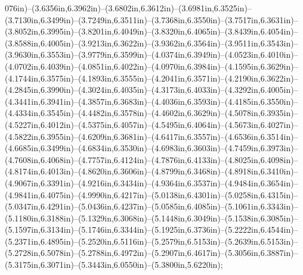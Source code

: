 076in)--(3.6356in,6.3962in)--(3.6802in,6.3612in)--(3.6981in,6.3525in)--(3.7130in,6.3499in)--(3.7249in,6.3511in)--(3.7368in,6.3550in)--(3.7517in,6.3631in)--(3.8052in,6.3995in)--(3.8201in,6.4049in)--(3.8320in,6.4065in)--(3.8439in,6.4054in)--(3.8588in,6.4005in)--(3.9213in,6.3622in)--(3.9362in,6.3564in)--(3.9511in,6.3543in)--(3.9630in,6.3553in)--(3.9779in,6.3599in)--(4.0374in,6.3949in)--(4.0523in,6.4010in)--(4.0702in,6.4039in)--(4.0851in,6.4022in)--(4.0970in,6.3984in)--(4.1595in,6.3629in)--(4.1744in,6.3575in)--(4.1893in,6.3555in)--(4.2041in,6.3571in)--(4.2190in,6.3622in)--(4.2845in,6.3990in)--(4.3024in,6.4035in)--(4.3173in,6.4033in)--(4.3292in,6.4005in)--(4.3441in,6.3941in)--(4.3857in,6.3683in)--(4.4036in,6.3593in)--(4.4185in,6.3550in)--(4.4334in,6.3545in)--(4.4482in,6.3578in)--(4.4602in,6.3629in)--(4.5078in,6.3935in)--(4.5227in,6.4012in)--(4.5375in,6.4057in)--(4.5495in,6.4064in)--(4.5673in,6.4027in)--(4.5822in,6.3955in)--(4.6209in,6.3681in)--(4.6417in,6.3557in)--(4.6536in,6.3514in)--(4.6685in,6.3499in)--(4.6834in,6.3530in)--(4.6983in,6.3603in)--(4.7459in,6.3973in)--(4.7608in,6.4068in)--(4.7757in,6.4124in)--(4.7876in,6.4133in)--(4.8025in,6.4098in)--(4.8174in,6.4013in)--(4.8620in,6.3606in)--(4.8799in,6.3468in)--(4.8918in,6.3410in)--(4.9067in,6.3391in)--(4.9216in,6.3434in)--(4.9364in,6.3537in)--(4.9484in,6.3654in)--(4.9841in,6.4075in)--(4.9990in,6.4217in)--(5.0138in,6.4301in)--(5.0258in,6.4315in)--(5.0347in,6.4291in)--(5.0436in,6.4237in)--(5.0585in,6.4085in)--(5.1061in,6.3343in)--(5.1180in,6.3188in)--(5.1329in,6.3068in)--(5.1448in,6.3049in)--(5.1538in,6.3085in)--(5.1597in,6.3134in)--(5.1746in,6.3344in)--(5.1925in,6.3736in)--(5.2222in,6.4544in)--(5.2371in,6.4895in)--(5.2520in,6.5116in)--(5.2579in,6.5153in)--(5.2639in,6.5153in)--(5.2728in,6.5078in)--(5.2788in,6.4972in)--(5.2907in,6.4617in)--(5.3056in,6.3887in)--(5.3175in,6.3071in)--(5.3443in,6.0550in)--(5.3800in,5.6220in);
